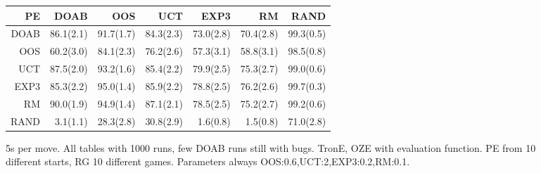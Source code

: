 \begin{figure}
\begin{footnotesize}

\begin{tabular}{|r|rrrrrr|}\hline
PE&DOAB&OOS&UCT&EXP3&RM&RAND\\\hline
DOAB&86.1(2.1)&91.7(1.7)&84.3(2.3)&73.0(2.8)&70.4(2.8)&99.3(0.5)\\
OOS&60.2(3.0)&84.1(2.3)&76.2(2.6)&57.3(3.1)&58.8(3.1)&98.5(0.8)\\
UCT&87.5(2.0)&93.2(1.6)&85.4(2.2)&79.9(2.5)&75.3(2.7)&99.0(0.6)\\
EXP3&85.3(2.2)&95.0(1.4)&85.9(2.2)&78.8(2.5)&76.2(2.6)&99.7(0.3)\\
RM&90.0(1.9)&94.9(1.4)&87.1(2.1)&78.5(2.5)&75.2(2.7)&99.2(0.6)\\
RAND&3.1(1.1)&28.3(2.8)&30.8(2.9)&1.6(0.8)&1.5(0.8)&71.0(2.8)\\
\hline
\end{tabular}

\end{footnotesize}
\caption{5s per move. All tables with 1000 runs, few DOAB runs still with bugs. TronE, OZE with evaluation function. PE from 10 different starts, RG 10 different games. Parameters always OOS:0.6,UCT:2,EXP3:0.2,RM:0.1.}
\end{figure}


